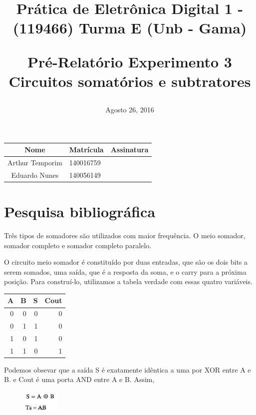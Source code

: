 \documentclass[12pts]{article}
\title{
	Prática de Eletrônica Digital 1 - (119466)
	\singlespacing
		Turma E (Unb - Gama)
	\singlespacing
	\begin{midpage}
	\begin {large}
		Pré-Relatório Experimento 3
		\singlespace
		Circuitos somatórios e subtratores
	\end {large}
	\end{midpage}
}
\date{Agosto 26, 2016}
\begin{document}
\maketitle	
\begin{center}

\begin{tabular}{|c|l|r|}
\hline
Nome & Matrícula & Assinatura\\
\hline
Arthur Temporim & 140016759 & \\
\hline	
Eduardo Nunes & 140056149 & \\
\hline	
\end{tabular}

\end{center}

\pagebreak

\section{Pesquisa bibliográfica}

Três tipos de somadores são utilizados com maior frequência. O meio somador, somador completo e somador completo paralelo.
	
O circuito meio somador é constituído por duas entradas, que são os dois bits a serem somados, uma saída, que é a resposta da soma, e o carry para a próxima posição. Para construí-lo, utilizamos a tabela verdade com essas quatro variáveis. 

\begin{center}
	\begin{tabular}{|r|r|r|r|}
		\hline
		A & B & S & Cout \\
		\hline
		0 & 0 & 0 & 0 \\				
		\hline
		0 & 1 & 1 & 0 \\
		\hline
		1 & 0 & 1 & 0 \\
		\hline
		1 & 1 & 0 & 1 \\
		\hline
	\end{tabular}
\end{center}

Podemos obsevar que a saída S é exatamente idêntica a uma por XOR entre A e B. e Cout é uma porta AND entre A e B. Assim, 

\begin{figure}[!htb]
  \centering
  \includegraphics[scale=0.8	]{imagens/1}
  \label{figRotulo}
\end{figure}
\end{document}
